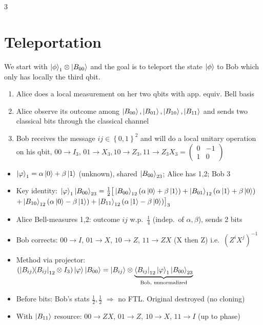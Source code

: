 \documentclass[10pt]{article}
\newcommand{\B}[1]{\ket{B_{#1}}}
\begin{document}
\begin{multicols*}{3}
\section{Teleportation}
We start with $\ket{\phi}_1 \otimes \ket{B_{00}}$ and the goal is to teleport the state $\ket{\phi}$ to Bob which only has locally the third qbit.
\begin{enumerate}
    \item Alice does a local measurement on her two qbits with app. equiv. Bell basis
    \item Alice observe its outcome among $\ket{B_{00}}, \ket{B_{01}}, \ket{B_{10}}, \ket{B_{11}}$ and sends two classical bits through the classical channel
    \item Bob receives the message $ij \in \left\{0, 1\right\}^{2}$ and will do a local unitary operation on his qbit, $00 \to I_3$, $01 \to X_3, 10 \to Z_3, 11 \to Z_3X_3 = \begin{pmatrix} 0 & -1 \\ 1 & 0 \end{pmatrix} $
\end{enumerate}

\begin{itemize}
  \item $\ket\varphi_1=\alpha\ket0+\beta\ket1$ (unknown), shared $\B{00}_{23}$; Alice has 1,2; Bob 3
  \item Key identity: $\ket\varphi_1\B{00}_{23}=\tfrac12\big[\B{00}_{12}(\alpha\ket0+\beta\ket1)+\B{01}_{12}(\alpha\ket1+\beta\ket0)$\\ $+\B{10}_{12}(\alpha\ket0-\beta\ket1)+\B{11}_{12}(\alpha\ket1-\beta\ket0)\big]_3$
  \item Alice Bell-measures 1,2: outcome $ij$ w.p.\ $\tfrac14$ (indep.\ of $\alpha,\beta$), sends 2 bits
  \item Bob corrects: $00\!\to\! I$, $01\!\to\! X$, $10\!\to\! Z$, $11\!\to\! ZX$ (X then Z) i.e.\ $(Z^iX^j)^{-1}$
  \item Method via projector: $(\dyad{B_{ij}}_{12}\otimes I_3)\ket\varphi\B{00}=\B{ij}\otimes\underbrace{\bra{B_{ij}}_{12}\ket\varphi_1\B{00}_{23}}_{\text{Bob, unnormalized}}$
  \item Before bits: Bob's stats $\tfrac12,\tfrac12$ $\Rightarrow$ no FTL. Original destroyed (no cloning)
  \item With $\B{11}$ resource: $00\!\to\!ZX$, $01\!\to\!Z$, $10\!\to\!X$, $11\!\to\!I$ (up to phase)
\end{itemize}


\end{multicols*}
\end{document}
